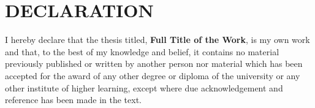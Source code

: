 \chapter*{DECLARATION}
I hereby declare that the thesis titled, \textbf{Full Title of the Work}, is my own work and that, to the best of my knowledge and belief, it contains no material previously published or written by another person nor material which has been accepted for the award of any other degree or diploma of the university or any other institute of higher learning, except where due acknowledgement and reference has been made in the text.\\

\vspace{2cm}
\newpage 
